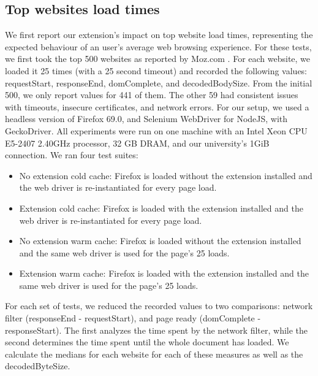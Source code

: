 \subsection{Top websites load times} \label{top_sites}
We first report our extension's impact on top website load times, representing the expected behaviour of an user's average web browsing experience. For these tests, we first took the top 500 websites as reported by Moz.com \cite{top500}. For each website, we loaded it 25 times (with a 25 second timeout) and recorded the following values: requestStart, responseEnd, domComplete, and decodedBodySize. From the initial 500, we only report values for 441 of them. The other 59 had consistent issues with timeouts, insecure certificates, and network errors. For our setup, we used a headless version of Firefox 69.0, and Selenium WebDriver for NodeJS, with GeckoDriver. All experiments were run on one machine with an Intel Xeon CPU E5-2407 2.40GHz processor, 32 GB DRAM, and our university's 1GiB connection. We ran four test suites:
\begin{itemize}
	\item No extension cold cache: Firefox is loaded without the extension installed and the web driver is re-instantiated for every page load.
	\item Extension cold cache: Firefox is loaded with the extension installed and the web driver is re-instantiated for every page load.
	\item No extension warm cache: Firefox is loaded without the extension installed and the same web driver is used for the page's 25 loads.
	\item Extension warm cache: Firefox is loaded with the extension installed and the same web driver is used for the page's 25 loads.
\end{itemize}


For each set of tests, we reduced the recorded values to two comparisons: network filter (responseEnd - requestStart), and page ready (domComplete - responseStart). The first analyzes the time spent by the network filter, while the second determines the time spent until the whole document has loaded. We calculate the medians for each website for each of these measures as well as the decodedByteSize.

